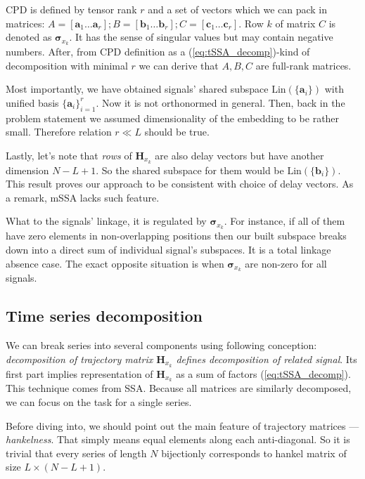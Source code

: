 \documentclass[referee, pdflatex, sn-mathphys-num]{sn-jnl}
\theoremstyle{definition}
\theoremstyle{plain}
\begin{document}
	CPD is defined by tensor rank $ r $ and a set of vectors which we can pack in matrices: $ A = [\mathbf{a}_1 \ldots \mathbf{a}_r]; B = [\mathbf{b}_1 \ldots \mathbf{b}_r]; C = [\mathbf{c}_1 \ldots \mathbf{c}_r] $. Row $ k $ of matrix $ C $ is denoted as $ \boldsymbol{\sigma}_{x_k} $. It has the sense of singular values but may contain negative numbers. After, from CPD definition as a (\ref{eq:tSSA_decomp})-kind of decomposition with minimal $ r $ we can derive that $ A, B, C $ are full-rank matrices.
	
	Most importantly, we have obtained signals' shared subspace $ \text{Lin}(\{\mathbf{a}_i\}) $ with unified basis $ \{\mathbf{a}_i\}_{i = 1}^r $. Now it is not orthonormed in general. Then, back in the problem statement we assumed dimensionality of the embedding to be rather small. Therefore relation $ r \ll L $ should be true.
	
	Lastly, let's note that \emph{rows} of $ \mathbf{H}_{x_k} $ are also delay vectors but have another dimension $ N - L + 1 $. So the shared subspace for them would be $ \text{Lin}(\{\mathbf{b}_i\}) $. This result proves our approach to be consistent with choice of delay vectors. As a remark, mSSA lacks such feature.
	
	What to the signals' linkage, it is regulated by $ \boldsymbol{\sigma}_{x_k} $. For instance, if all of them have zero elements in non-overlapping positions then our built subspace breaks down into a direct sum of individual signal's subspaces. It is a total linkage absence case. The exact opposite situation is when $ \boldsymbol{\sigma}_{x_k} $ are non-zero for all signals.
	
	\subsection{Time series decomposition}\label{sec:decomposition}
	
	We can break series into several components using following conception: \emph{decomposition of trajectory matrix $ \mathbf{H}_{x_k} $ defines decomposition of related signal}. Its first part implies representation of $ \mathbf{H}_{x_k} $ as a sum of factors (\ref{eq:tSSA_decomp}). This technique comes from SSA. Because all matrices are similarly decomposed, we can focus on the task for a single series.
	
	Before diving into, we should point out the main feature of trajectory matrices --- \emph{hankelness}. That simply means equal elements along each anti-diagonal. So it is trivial that every series of length $ N $ bijectionly corresponds to hankel matrix of size $ L \times (N - L + 1) $.
	
\end{document}
